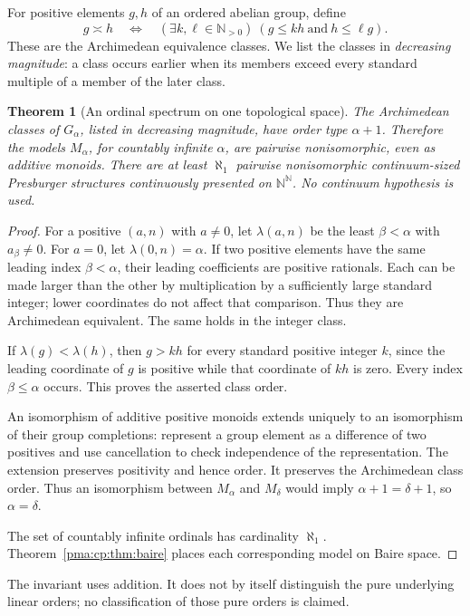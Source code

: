 \documentclass[11pt]{article}
\numberwithin{equation}{section}
\newtheorem{theorem}{Theorem}[section]
\theoremstyle{definition}
\theoremstyle{remark}
\newcommand{\N}{\mathbb N}
\newcommand{\Baire}{\N^{\N}}
\begin{document}
For positive elements $g,h$ of an ordered abelian group, define
\[
g\asymp h\quad\Longleftrightarrow\quad
(\exists k,\ell\in\N_{>0})\ (g\leq kh\ \text{and}\ h\leq\ell g).
\]
These are the Archimedean equivalence classes. We list the classes in
\emph{decreasing magnitude}: a class occurs earlier when its members
exceed every standard multiple of a member of the later class.

\begin{theorem}[An ordinal spectrum on one topological space]
\label{pma:cp:thm:spectrum}
The Archimedean classes of $G_\alpha$, listed in decreasing magnitude,
have order type $\alpha+1$. Therefore the models $M_\alpha$, for
countably infinite $\alpha$, are pairwise nonisomorphic, even as additive
monoids. There are at least $\aleph_1$ pairwise nonisomorphic
continuum-sized Presburger structures continuously presented on $\Baire$.
No continuum hypothesis is used.
\end{theorem}

\begin{proof}
For a positive $(a,n)$ with $a\ne0$, let $\lambda(a,n)$ be the least
$\beta<\alpha$ with $a_\beta\ne0$. For $a=0$, let
$\lambda(0,n)=\alpha$. If two positive elements have the same leading
index $\beta<\alpha$, their leading coefficients are positive rationals.
Each can be made larger than the other by multiplication by a sufficiently
large standard integer; lower coordinates do not affect that comparison.
Thus they are Archimedean equivalent. The same holds in the integer class.

If $\lambda(g)<\lambda(h)$, then $g>kh$ for every standard positive
integer $k$, since the leading coordinate of $g$ is positive while that
coordinate of $kh$ is zero. Every index $\beta\leq\alpha$ occurs.
This proves the asserted class order.

An isomorphism of additive positive monoids extends uniquely to an
isomorphism of their group completions: represent a group element as a
difference of two positives and use cancellation to check independence of
the representation. The extension preserves positivity and hence order.
It preserves the Archimedean class order. Thus an isomorphism between
$M_\alpha$ and $M_\delta$ would imply $\alpha+1=\delta+1$, so
$\alpha=\delta$.

The set of countably infinite ordinals has cardinality $\aleph_1$.
Theorem~\ref{pma:cp:thm:baire} places each corresponding model on Baire space.
\end{proof}

The invariant uses addition. It does not by itself distinguish the pure
underlying linear orders; no classification of those pure orders is claimed.
\end{document}

